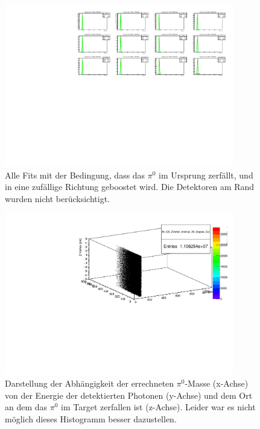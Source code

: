 \documentclass[a4paper,11pt,oneside,final,german,openbib,pdftex]{scrbook}
\begin{document}
{\begin{appendix}
\begin{figure}[h!]
	\begin{center}
		\includegraphics[width=100mm]{NewCalib/UrsprungIsotrop/20171904SimIsotropUrsprung30DegreeCutAllFits}
		\caption{Alle Fits mit der Bedingung, dass das $\pi^0$ im Ursprung zerf\"allt, und in eine zuf\"allige Richtung geboostet wird. Die Detektoren am Rand wurden nicht ber\"ucksichtigt.}
	\end{center}
	
\end{figure}

\begin{figure}[h!]
	\begin{center}
		\includegraphics[width=100mm]{NewCalib/20171904SimZVertex3DHist}
		\caption{Darstellung der Abh\"angigkeit der errechneten $\pi^0$-Masse (x-Achse) von der Energie der detektierten Photonen (y-Achse) und dem Ort an dem das $\pi^0$ im Target zerfallen ist (z-Achse).
		Leider war es nicht m\"oglich dieses Histogramm besser dazustellen.}
	\label{fig:Z-Vertex-3D-Hist}
	\end{center}
\end{figure}



\end{appendix}}
\end{document}
